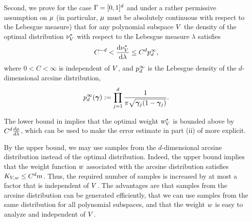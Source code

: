 Second, we prove for the case $\Gamma=[0,1]^d$ and under a rather permissive assumption on $\mu$ (in particular, $\mu$ must be absolutely continuous with respect to the Lebesgue measure) that for any polynomial subspace $V$ the density of the optimal distribution $\nu^{*}_{V}$ with respect to the Lebesgue measure $\lambda$ satisfies
\begin{equation}
\label{eq:temparcsine}
C^{-d}<\frac{\text{d}\nu^{*}_{V}}{\text{d}\lambda}\leq C^d p^{\infty}_{d},
\end{equation}
where $0<C<\infty$ is independent of $V$, and $p^{\infty}_{d}$ is the Lebesgue density of the $d$-dimensional arcsine distribution,
\begin{equation}
\label{eq:arcdef}
p^{\infty}_{d}(\bm{\gamma}):=\prod_{j=1}^{d}\frac{1}{\pi\sqrt{\bm{\gamma}_j(1-\bm{\gamma}_j)}}.
\end{equation}

The lower bound in  implies that the optimal weight $w^{*}_{V}$ is bounded above by $C^{d}\frac{d\mu}{d\lambda}$, which can be used to make the error estimate in part (ii) of  more explicit.

By the upper bound, we may use samples from the $d$-dimensional arcsine distribution instead of the optimal distribution.
	Indeed, the upper bound implies that the weight function $w$ associated with the arcsine distribution satisfies $K_{V,w}\leq C^dm$. Thus, the required number of samples is increased by at most a factor that is independent of $V$. The advantages are that samples from the arcsine distribution can be generated efficiently, that we can use samples from the same distribution for all polynomial subspaces, and that the weight $w$ is easy to analyze and independent of $V$.



